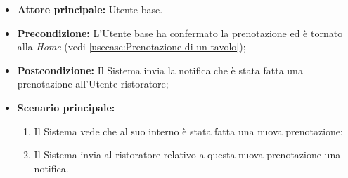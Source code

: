 \label{usecase:Notifica prenotazione}
\begin{itemize}
	\item \textbf{Attore principale:} Utente base.
	
	\item \textbf{Precondizione:} L'Utente base ha confermato la prenotazione ed è tornato alla \textit{Home} (vedi \autoref{usecase:Prenotazione di un tavolo});

    
	\item \textbf{Postcondizione:} Il Sistema invia la notifica che è stata fatta una prenotazione all'Utente ristoratore;
     
	\item \textbf{Scenario principale:}
	      \begin{enumerate}
                \item Il Sistema vede che al suo interno è stata fatta una nuova prenotazione;
                \item Il Sistema invia al ristoratore relativo a questa nuova prenotazione una notifica.
	      \end{enumerate}
\end{itemize}